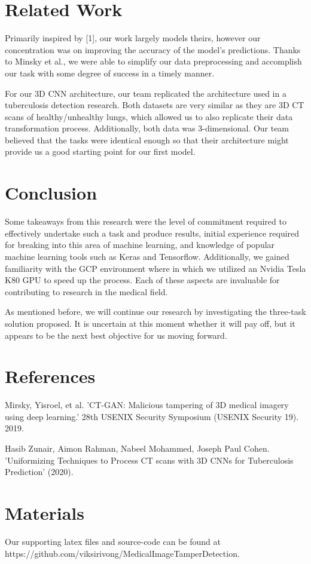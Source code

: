 \documentclass[conference]{IEEEtran}
\begin{document}
\section{Related Work}
Primarily inspired by [1], our work largely models theirs, however our concentration was on improving the accuracy of the model's predictions. Thanks to Minsky et al., we were able to simplify our data preprocessing and accomplish our task with some degree of success in a timely manner.
\par
For our 3D CNN architecture, our team replicated the architecture used in a tuberculosis detection research. Both datasets are very similar as they are 3D CT scans of healthy/unhealthy lungs, which allowed us to also replicate their data transformation process. Additionally, both data was 3-dimensional. Our team believed that the tasks were identical enough so that their architecture might provide us a good starting point for our first model. 
\section{Conclusion}
Some takeaways from this research were the level of commitment required to effectively undertake such a task and produce results, initial experience required for breaking into this area of machine learning, and knowledge of popular machine learning tools such as Keras and Tensorflow. Additionally, we gained familiarity with the GCP environment where in which we utilized an Nvidia Tesla K80 GPU to speed up the process. Each of these aspects are invaluable for contributing to research in the medical field.
\par
As mentioned before, we will continue our research by investigating the three-task solution proposed. It is uncertain at this moment whether it will pay off, but it appears to be the next best objective for us moving forward.

\section{References}
\begin{thebibliography}{9}
    Mirsky, Yisroel, et al. 'CT-GAN: Malicious tampering of 3D medical imagery using deep learning.' 28th {USENIX} Security Symposium ({USENIX} Security 19). 2019.
    
    Hasib Zunair, Aimon Rahman, Nabeel Mohammed, Joseph Paul Cohen. 'Uniformizing Techniques to Process CT scans with 3D CNNs for Tuberculosis Prediction' (2020).
    
\end{thebibliography}

\section{Materials}
Our supporting latex files and source-code can be found at https://github.com/viksirivong/MedicalImageTamperDetection.
\end{document}

